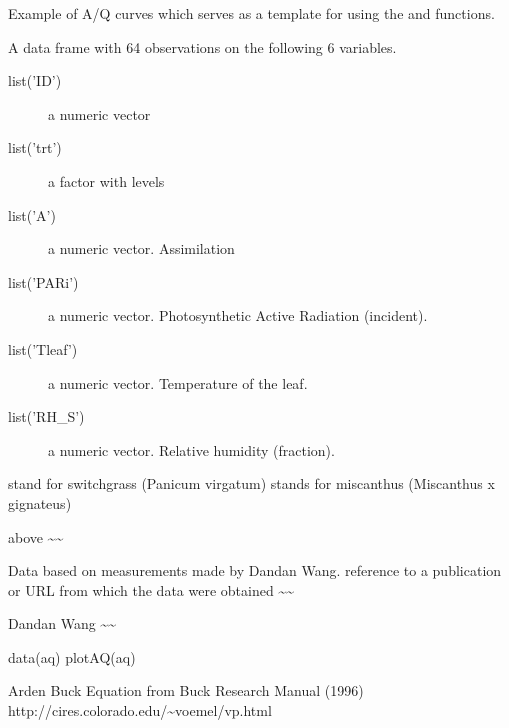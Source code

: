 \documentclass[letterpaper]{book}
\begin{document}
%
\begin{Description}\relax
Example of A/Q curves which serves as a template for
using the  and
 functions.
\end{Description}
%
\begin{Format}
A data frame with 64 observations on the following 6 variables.
\begin{description}
 \item[list('ID')] a numeric vector\item[list('trt')] a factor
with levels  \item[list('A')] a numeric vector.
Assimilation\item[list('PARi')] a numeric vector. Photosynthetic Active
Radiation (incident).\item[list('Tleaf')] a numeric vector. Temperature
of the leaf.\item[list('RH\_S')] a numeric vector. Relative humidity
(fraction).
\end{description}
\end{Format}
%
\begin{Details}\relax
{} stand for switchgrass (Panicum virgatum)
 stands for miscanthus (Miscanthus x gignateus)


above \textasciitilde{}\textasciitilde{}
\end{Details}
%
\begin{Source}\relax
Data based on measurements made by Dandan Wang. 
reference to a publication or URL from which the data
were obtained \textasciitilde{}\textasciitilde{}
\end{Source}
%
\begin{References}\relax
Dandan Wang 
\textasciitilde{}\textasciitilde{}
\end{References}
%
\begin{Examples}
\begin{ExampleCode}
data(aq)
plotAQ(aq)
\end{ExampleCode}
\end{Examples}
%
\begin{Description}\relax
Arden Buck Equation from Buck Research Manual (1996)
http://cires.colorado.edu/\textasciitilde{}voemel/vp.html
\end{Description}
\end{document}
